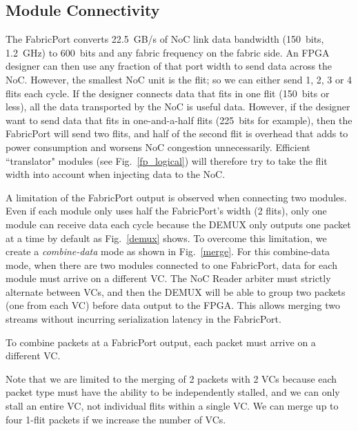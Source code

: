 %
\subsection{Module Connectivity}
%

The FabricPort converts 22.5~GB/s of NoC link data bandwidth (150~bits, 1.2~GHz) to 600~bits and any fabric frequency on the fabric side.
An FPGA designer can then use any fraction of that port width to send data across the NoC.
However, the smallest NoC unit is the flit; so we can either send 1, 2, 3 or 4 flits each cycle.
If the designer connects data that fits in one flit (150~bits or less), all the data transported by the NoC is useful data.
However, if the designer want to send data that fits in one-and-a-half flits (225~bits for example), then the FabricPort will send two flits, and half of the second flit is overhead that adds to power consumption and worsens NoC congestion unnecessarily.
Efficient ``translator" modules (see Fig.~\ref{fp_logical}) will therefore try to take the flit width into account when injecting data to the NoC.

A limitation of the FabricPort output is observed when connecting two modules.
Even if each module only uses half the FabricPort's width (2 flits), only one module can receive data each cycle because the DEMUX only outputs one packet at a time by default as Fig.~\ref{demux} shows.
To overcome this limitation, we create a \textit{combine-data} mode as shown in Fig.~\ref{merge}.
For this combine-data mode, when there are two modules connected to one FabricPort, data for each module must arrive on a different VC.
The NoC Reader arbiter must strictly alternate between VCs, and then the DEMUX will be able to group two packets (one from each VC) before data output to the FPGA.
This allows merging two streams without incurring serialization latency in the FabricPort.
%
\begin{cond}
To combine packets at a FabricPort output, each packet must arrive on a different VC.
\end{cond}
%
Note that we are limited to the merging of 2 packets with 2 VCs because each packet type must have the ability to be independently stalled, and we can only stall an entire VC, not individual flits within a single VC.
We can merge up to four 1-flit packets if we increase the number of VCs.

